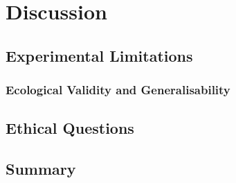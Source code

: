 \chapter{Discussion} \label{chap:discussion}
\section{Experimental Limitations} \label{sec:disc_limitations}

\subsection{Ecological Validity and Generalisability} \label{sec:disc_experiments}

\section{Ethical Questions} \label{sec:disc_ethics}

\section{Summary} \label{sec:disc_summary}
